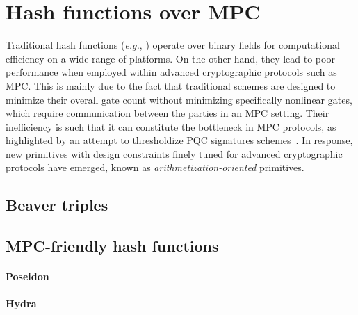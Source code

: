 \section{Hash functions over MPC}

Traditional hash functions (\textit{e.g.}, \KECCAK) operate over binary fields for computational efficiency on a wide range of platforms.
On the other hand, they lead to poor performance when employed within advanced cryptographic protocols such as MPC.
This is mainly due to the fact that traditional schemes are designed to minimize their overall gate count without minimizing specifically nonlinear gates, which require communication between the parties in an MPC setting.%
Their inefficiency is such that it can constitute the bottleneck in MPC protocols, as highlighted by an attempt to thresholdize PQC signatures schemes~\cite{sharing_luov19}.
In response, new primitives with design constraints finely tuned for advanced cryptographic protocols have emerged, known as \textit{arithmetization-oriented} primitives.
\subsection{Beaver triples}
\subsection{MPC-friendly hash functions}
\paragraph{Poseidon}
\paragraph{Hydra}